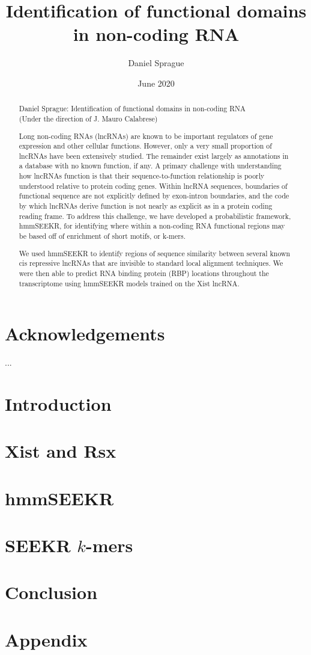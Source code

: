 \documentclass[12pt,left=1in,right=1in,top=1in,bottom=1in]{report}
\title{
    {Identification of functional domains \linebreak in non-coding RNA}\\
    }
\author{Daniel Sprague}
\date{June 2020}
\begin{document}
\maketitle
\begin{abstract}
\begin{center}
Daniel Sprague: Identification of functional domains in non-coding RNA\\
(Under the direction of J. Mauro Calabrese)
\end{center}
Long non-coding RNAs (lncRNAs) are known to be important regulators of gene expression and other cellular functions. However, only a very small proportion of lncRNAs have been extensively studied. The remainder exist largely as annotations in a database with no known function, if any. A primary challenge with understanding how lncRNAs function is that their sequence-to-function relationship is poorly understood relative to protein coding genes. Within lncRNA sequences, boundaries of functional sequence are not explicitly defined by exon-intron boundaries, and the code by which lncRNAs derive function is not nearly as explicit as in a protein coding reading frame. To address this challenge, we have developed a probabilistic framework, hmmSEEKR, for identifying where within a non-coding RNA functional regions may be based off of enrichment of short motifs, or k-mers. 

We used hmmSEEKR to identify regions of sequence similarity between several known cis repressive lncRNAs that are invisible to standard local alignment techniques. We were then able to predict RNA binding protein (RBP) locations throughout the transcriptome using hmmSEEKR models trained on the Xist lncRNA.
\end{abstract}
\chapter*{\center Acknowledgements}
\begin{center}
...
\end{center}
\tableofcontents
\chapter{Introduction}


\chapter{Xist and Rsx}


\chapter{hmmSEEKR}


\chapter{SEEKR $k$-mers}



\chapter{Conclusion}


\appendix
\chapter{Appendix}

\end{document}
